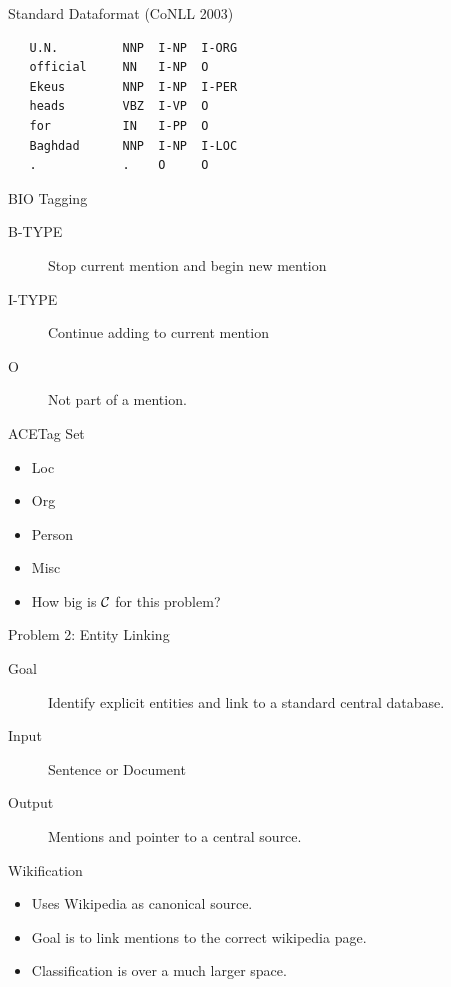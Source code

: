 \documentclass{beamer}
\begin{document}
\begin{frame}[fragile]{Standard Dataformat (CoNLL 2003)}
\begin{verbatim}
   U.N.         NNP  I-NP  I-ORG 
   official     NN   I-NP  O 
   Ekeus        NNP  I-NP  I-PER 
   heads        VBZ  I-VP  O 
   for          IN   I-PP  O 
   Baghdad      NNP  I-NP  I-LOC 
   .            .    O     O 
\end{verbatim}
\end{frame}

\begin{frame}{BIO Tagging}
  \begin{description}
  \item[B-TYPE] Stop current mention and begin new mention
    \air 
  \item[I-TYPE] Continue adding to current mention
  \item[O ] Not part of a mention.
  \end{description}
\end{frame}

\begin{frame}{ACETag Set}
  \begin{itemize}
  \item Loc
  \item Org
  \item Person
  \item Misc 
  \end{itemize}
  \air 
  
  \begin{itemize}
  \item How big is $\mathcal{C}$ for this problem?
  \end{itemize}
\end{frame}

\begin{frame}{Problem 2: Entity Linking}
  \begin{description}
  \item[Goal] Identify explicit entities and link to a standard
  central database.
  \item[Input] Sentence or Document
  \item[Output] Mentions and pointer to a central source.
  \end{description}  

\end{frame}


\begin{frame}{Wikification }
  \begin{itemize}
  \item Uses Wikipedia as canonical source.

    \air
  \item Goal is to link mentions to the correct wikipedia page. 

    \air
  \item Classification is over a much larger space. 
  \end{itemize}
\end{frame}
\end{document}
